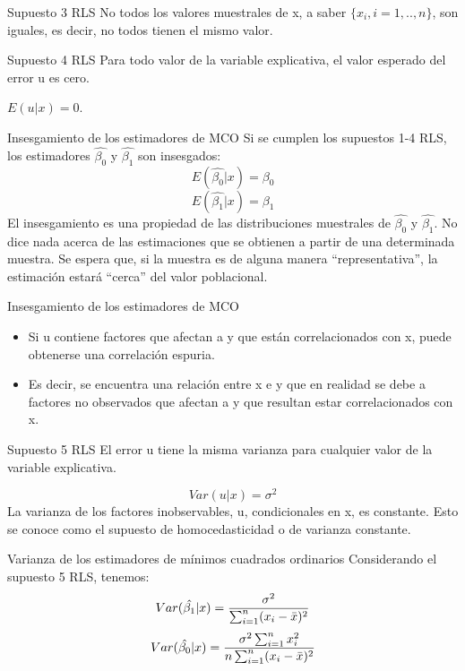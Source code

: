 \documentclass{beamer}
\begin{document}
\begin{frame}{Supuesto 3 RLS}
    No todos los valores muestrales de x, a saber $\lbrace x_i, i = 1,.., n\rbrace$, son iguales, es decir, no todos tienen
el mismo valor.
\end{frame}
\begin{frame}{Supuesto 4 RLS}
    Para todo valor de la variable explicativa, el valor esperado del error u es cero. 
    
$E(u|x) = 0$.
\end{frame}
\begin{frame}{Insesgamiento de los estimadores de MCO}
    Si se cumplen los supuestos 1-4 RLS, los estimadores $\hat{\beta_0}$ y $\hat{\beta_1}$ son insesgados:
$$E(\hat{\beta_0}|x)=\beta_0$$
$$E(\hat{\beta_1}|x)=\beta_1$$
El insesgamiento es una propiedad de las distribuciones muestrales de $\hat{\beta_0}$ y $\hat{\beta_1}$.
No dice nada acerca de las estimaciones que se obtienen a partir de una determinada
muestra. Se espera que, si la muestra es de alguna manera “representativa”, la estimación estará “cerca” del valor poblacional.
     
\end{frame}
\begin{frame}{Insesgamiento de los estimadores de MCO}
    
    \begin{itemize}
        \item Si u contiene factores que afectan a y  que están
correlacionados con x, puede obtenerse una {\color{blue} correlación espuria}.
\item Es decir, se encuentra
una relación entre  x e y que en realidad se debe a factores no observados que afectan a y  que
resultan estar correlacionados con x.
    \end{itemize}
\end{frame}
\begin{frame}{Supuesto 5 RLS}
    El error u tiene la misma varianza para cualquier valor de la variable explicativa. 
    
$$Var(u|x)=\sigma^2$$
La varianza de los
factores inobservables, u, condicionales en x, es constante. Esto se conoce como el supuesto de {\color{blue}
homocedasticidad o de varianza constante.}
\end{frame}
\begin{frame}{Varianza de los estimadores de mínimos cuadrados ordinarios}
Considerando el supuesto 5 RLS, tenemos:
$$Var(\hat{\beta_1}|x)={\sigma^2\over \sum_{i=1}^n(x_i-\bar{x})^2} $$
$$Var(\hat{\beta_0}|x)={\sigma^2 \sum_{i=1}^nx_i^2\over n\sum_{i=1}^n(x_i-\bar{x})^2 }$$
    
\end{frame}
\end{document}
